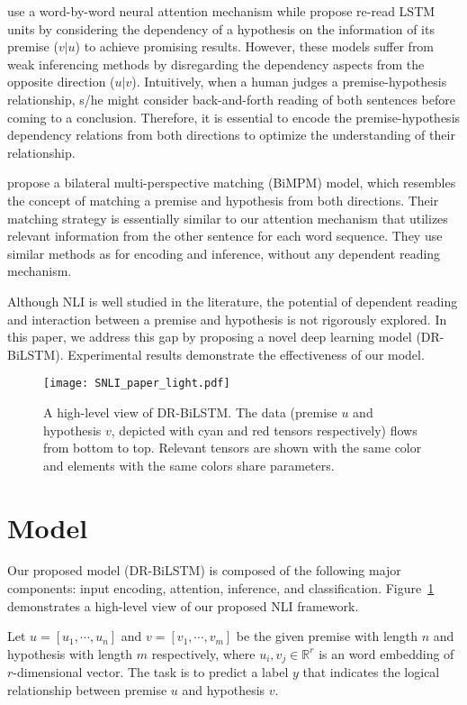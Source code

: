 \documentclass[11pt,a4paper]{article}
\begin{document}
	\citet{Rocktaschel2015} use a word-by-word neural attention mechanism while \citet{re-read} propose re-read LSTM units by considering the dependency of a hypothesis on the information of its premise ($v|u$) to achieve promising results. However, these models suffer from weak inferencing methods by disregarding the dependency aspects from the opposite direction ($u|v$). Intuitively, when a human judges a premise-hypothesis relationship, s/he might consider back-and-forth reading of both sentences before coming to a conclusion. Therefore, it is essential to encode the premise-hypothesis dependency relations from both directions to optimize the understanding of their relationship.    
	
	\citet{ibm2017} propose a bilateral multi-perspective matching (BiMPM) model, which resembles the concept of matching a premise and hypothesis from both directions. Their matching strategy is essentially similar to our attention mechanism that utilizes relevant information from the other sentence for each word sequence. They use similar methods as \citet{him2017} for encoding and inference, without any dependent reading mechanism. 
	
	Although NLI is well studied in the literature, the potential of dependent reading and interaction between a premise and hypothesis is not rigorously explored. In this paper, we address this gap by proposing a novel deep learning model (DR-BiLSTM). Experimental results demonstrate the effectiveness of our model.
	
	\begin{figure}[ht]
		\centering
		\texttt{[image: SNLI\_paper\_light.pdf]}
		\caption{A high-level view of DR-BiLSTM. The data (premise $u$ and hypothesis $v$, depicted with cyan and red tensors respectively) flows from bottom to top. Relevant tensors are shown with the same color and elements with the same colors share parameters. \label{fig:model}}
	\end{figure}
	
	\section{Model}
	Our proposed model (DR-BiLSTM) is composed of the following major components: input encoding, attention, inference, and classification. Figure~\ref{fig:model} demonstrates a high-level view of our proposed NLI framework. 
	
	Let $u=[u_1, \cdots, u_n]$ and $v=[v_1, \cdots, v_m]$ be the given premise with length $n$ and hypothesis with length $m$ respectively, where $u_i, v_j \in \mathbb{R}^r$ is an word embedding of $r$-dimensional vector. The task is to predict a label $y$ that indicates the logical relationship between premise $u$ and hypothesis $v$.
	
\end{document}

